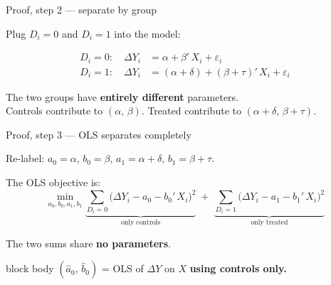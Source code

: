 \documentclass[aspectratio=169,11pt]{beamer}
\newcommand{\emphbox}[1]{%
  \begin{beamercolorbox}[rounded=true,sep=7pt,wd=\linewidth]{block body}%
    \small\color{slate} #1%
  \end{beamercolorbox}}
\begin{document}
\begin{frame}{Proof, step 2 --- separate by group}
\vspace{0.3em}
\begin{center}\color{warmgray}\small Plug $D_i = 0$ and $D_i = 1$ into the model:\end{center}
\vspace{0.4em}
\begin{align*}
D_i = 0: \quad \Delta Y_i &= \alpha + \beta'\, X_i + \varepsilon_i \\[6pt]
D_i = 1: \quad \Delta Y_i &= (\alpha + \delta) + (\beta + \tau)'\, X_i + \varepsilon_i
\end{align*}
\vspace{0.4em}
\begin{center}
The two groups have \textbf{entirely different} parameters.\\[0.4em]
\color{warmgray}\small
Controls contribute to $(\alpha,\,\beta)$.\quad
Treated contribute to $(\alpha+\delta,\,\beta+\tau)$.
\end{center}
\end{frame}

\begin{frame}{Proof, step 3 --- OLS separates completely}
\vspace{0.4em}
\begin{center}\color{warmgray}\small
Re-label: \;$a_0 = \alpha$, \;$b_0 = \beta$, \;$a_1 = \alpha+\delta$, \;$b_1 = \beta+\tau$.
\end{center}
\vspace{0.3em}
The OLS objective is:
\[
\min_{a_0,b_0,a_1,b_1}
  \underbrace{\sum_{D_i=0}\!\bigl(\Delta Y_i - a_0 - b_0'\,X_i\bigr)^{\!2}}_{\text{only controls}}
  \;+\;
  \underbrace{\sum_{D_i=1}\!\bigl(\Delta Y_i - a_1 - b_1'\,X_i\bigr)^{\!2}}_{\text{only treated}}
\]
\vspace{0.3em}
\begin{center}
The two sums share \textbf{no parameters}.\\[0.4em]
\emphbox{$(\hat a_0,\,\hat b_0)$ \;=\; OLS of $\Delta Y$ on $X$ \textbf{using controls only.}}
\end{center}
\end{frame}
\end{document}
